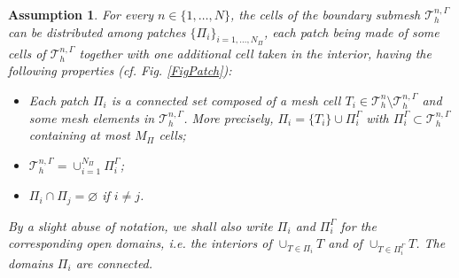 \documentclass[10pt,a4paper]{amsart}
\newtheorem{assumption}{Assumption}
\begin{document}
\begin{assumption}\label{asm2}
	For every $n\in\{1,\ldots,N\}$, the cells of the boundary submesh $\mathcal{T}_h^{n,\Gamma}$ can be {distributed among} patches $\{\Pi_i \}_{i = 1,\ldots, N_{\Pi}}$, {each patch being made of some cells of $\mathcal{T}_h^{n,\Gamma}$ together with one additional cell taken in the interior,} having the following properties (cf. Fig. \ref{FigPatch}):
	\begin{itemize}
		\item Each patch $\Pi_i$ is a connected set composed of a mesh cell $T_i\in\mathcal{T}_h^n\setminus\mathcal{T}_h^{n,\Gamma}$ and some mesh elements in $\mathcal{T}_h^{n,\Gamma}$. More precisely, $\Pi_i = \{T_i\} \cup \Pi_i^{\Gamma}$ with $\Pi_i^{\Gamma}{}\subset\mathcal{T}_h^{n,\Gamma}$ containing at most $M_\Pi$ cells;
		\item $\mathcal{T}_h^{n,\Gamma} = \cup_{i = 1}^{N_{\Pi}} \Pi_i^{\Gamma}$;
		\item $\Pi_i \cap \Pi_j = \varnothing$ if $i \neq j$.
	\end{itemize}
	By a slight abuse of notation, we shall also write $\Pi_i$ and $\Pi_i^\Gamma$ for the corresponding open domains, i.e. the interiors of $\cup_{T\in\Pi_i}T$ and of $\cup_{T\in\Pi_i^\Gamma}T$. The domains $\Pi_i$ are connected.
\end{assumption}
\end{document}
